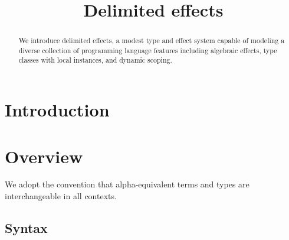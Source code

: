 \documentclass[12pt]{article}
\title{Delimited effects}
\date{}
\begin{document}
  \maketitle

  \begin{abstract}
    We introduce delimited effects, a modest type and effect system capable of modeling a diverse collection of programming language features including algebraic effects, type classes with local instances, and dynamic scoping.
  \end{abstract}

  \section{Introduction}

    \iffalse
      \begin{lstlisting}[gobble=4]
        effect IO
          getLine   : String ! IO
          printLine : String -> () ! IO
      \end{lstlisting}

      \begin{lstlisting}[gobble=4]
        effect Monoid a
          mempty  : a ! Monoid a
          mappend : a -> a -> a ! Monoid a
      \end{lstlisting}
    \fi

  \section{Overview}

    We adopt the convention that alpha-equivalent terms and types are interchangeable in all contexts.

    \subsection{Syntax}
\end{document}
